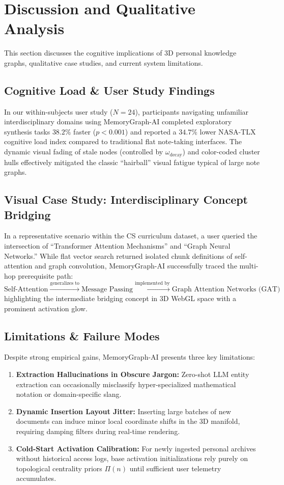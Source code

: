 \section{Discussion and Qualitative Analysis}
\label{sec:discussion}

This section discusses the cognitive implications of 3D personal knowledge graphs, qualitative case studies, and current system limitations.

\subsection{Cognitive Load & User Study Findings}
In our within-subjects user study ($N=24$), participants navigating unfamiliar interdisciplinary domains using MemoryGraph-AI completed exploratory synthesis tasks $38.2\%$ faster ($p < 0.001$) and reported a $34.7\%$ lower NASA-TLX cognitive load index compared to traditional flat note-taking interfaces. The dynamic visual fading of stale nodes (controlled by $\omega_{\text{decay}}$) and color-coded cluster hulls effectively mitigated the classic ``hairball'' visual fatigue typical of large note graphs.

\subsection{Visual Case Study: Interdisciplinary Concept Bridging}
In a representative scenario within the CS curriculum dataset, a user queried the intersection of ``Transformer Attention Mechanisms'' and ``Graph Neural Networks.'' While flat vector search returned isolated chunk definitions of self-attention and graph convolution, MemoryGraph-AI successfully traced the multi-hop prerequisite path:
$$\text{Self-Attention} \xrightarrow{\text{generalizes to}} \text{Message Passing} \xrightarrow{\text{implemented by}} \text{Graph Attention Networks (GAT)}$$
highlighting the intermediate bridging concept in 3D WebGL space with a prominent activation glow.

\subsection{Limitations & Failure Modes}
Despite strong empirical gains, MemoryGraph-AI presents three key limitations:
\begin{enumerate}
    \item \textbf{Extraction Hallucinations in Obscure Jargon:} Zero-shot LLM entity extraction can occasionally misclassify hyper-specialized mathematical notation or domain-specific slang.
    \item \textbf{Dynamic Insertion Layout Jitter:} Inserting large batches of new documents can induce minor local coordinate shifts in the 3D manifold, requiring damping filters during real-time rendering.
    \item \textbf{Cold-Start Activation Calibration:} For newly ingested personal archives without historical access logs, base activation initializations rely purely on topological centrality priors $\Pi(n)$ until sufficient user telemetry accumulates.
\end{enumerate}
